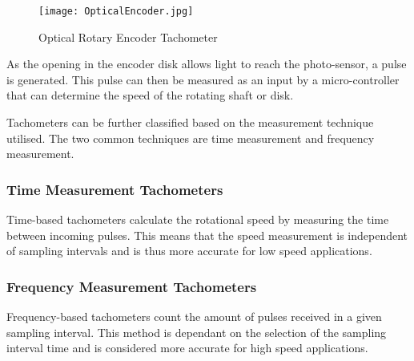 \begin{figure}[H]
	\begin{center}
		\texttt{[image: OpticalEncoder.jpg]}
		\caption{Optical Rotary Encoder Tachometer}
		\label{fig:RotaryEncoder}
		\citep{analogic:2018}
	\end{center}
\end{figure}

\vspace*{-0.5cm}

As the opening in the encoder disk allows light to reach the photo-sensor, a pulse is generated. This pulse can then be measured as an input by a micro-controller that can determine the speed of the rotating shaft or disk.

Tachometers can be further classified based on the measurement technique utilised. The two common techniques are time measurement and frequency measurement. 

\subsubsection{Time Measurement Tachometers}
Time-based tachometers calculate the rotational speed by measuring the time between incoming pulses. This means that the speed measurement is independent of sampling intervals and is thus more accurate for low speed applications. \citep{analogic:2018}

\subsubsection{Frequency Measurement Tachometers}
Frequency-based tachometers count the amount of pulses received in a given sampling interval. This method is dependant on the selection of the sampling interval time and is considered more accurate for high speed applications. \citep{analogic:2018}
